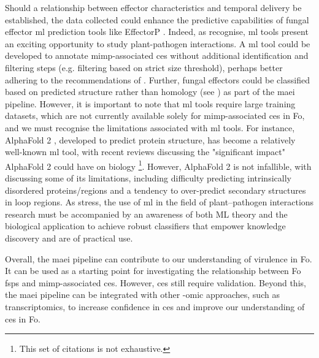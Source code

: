 Should a relationship between effector characteristics and temporal delivery be established, the data collected could enhance the predictive capabilities of fungal effector \ac{ml} prediction tools like EffectorP \parencite{Sperschneider2022}. Indeed, as \textcite{Sperschneider2020} recognise, \ac{ml} tools present an exciting opportunity to study plant-pathogen interactions. A \ac{ml} tool could be developed to annotate \ac{mimp}-associated \acp{ce} without additional identification and filtering steps (e.g. filtering based on strict size threshold), perhaps better adhering to the recommendations of \textcite{Sperschneider2015, LoPresti2015, Todd2022}. Further, fungal effectors could be classified based on predicted structure rather than homology (see \textcite{Seong2023}) as part of the \ac{maei} pipeline. However, it is important to note that \ac{ml} tools require large training datasets, which are not currently available solely for \ac{mimp}-associated \acp{ce} in \ac{Fo}, and we must recognise the limitations associated with \ac{ml} tools. For instance, AlphaFold 2 \parencite{Jumper2021}, developed to predict protein structure, has become a relatively well-known \ac{ml} tool, with recent reviews discussing the "significant impact" \parencite{Yang2023} AlphaFold 2 could have on biology \parencite{Skolnick2021, Marcu2022, Varadi2023}\footnote{This set of citations is not exhaustive.}. However, AlphaFold 2 is not infallible, with \textcite{Bertoline2023} discussing some of its limitations, including difficulty predicting intrinsically disordered proteins/regions and a tendency to over-predict secondary structures in loop regions. As \textcite{Sperschneider2020} stress, the use of \ac{ml} in the field of plant–pathogen interactions research must be accompanied by an awareness of both ML theory and the biological application to achieve robust classifiers that empower knowledge discovery and are of practical use. 


Overall, the \ac{maei} pipeline can contribute to our understanding of virulence in \ac{Fo}. It can be used as a starting point for investigating the relationship between \ac{Fo} \acp{fsp} and \ac{mimp}-associated \acp{ce}. However, \acp{ce} still require validation. Beyond this, the \ac{maei} pipeline can be integrated with other -omic approaches, such as transcriptomics, to increase confidence in \acp{ce} and improve our understanding of \acp{ce} in \ac{Fo}. 

